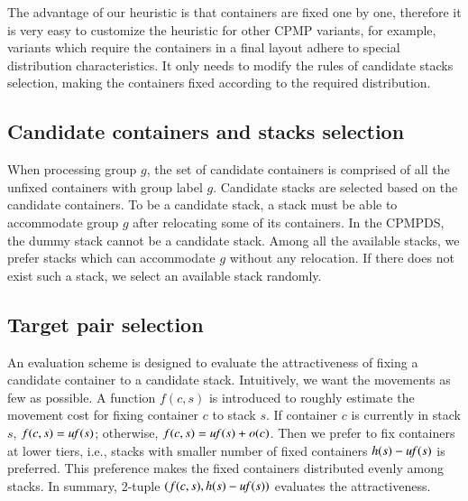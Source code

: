 \documentclass[review,3p,times,authoryear,12pt]{elsarticle}
\begin{document}
The advantage of our heuristic is that containers are fixed one by one, therefore it is very easy to customize the heuristic for other CPMP variants, for example, variants which require the containers in a final layout adhere to special distribution characteristics. It only needs to modify the rules of candidate stacks selection, making the containers fixed according to the required distribution.



\subsection{Candidate containers and stacks selection}
\label{sec:can}
When processing group $g$, the set of candidate containers is comprised of all the unfixed containers with group label $g$. Candidate stacks are selected based on the candidate containers.
To be a candidate stack, a stack must be able to accommodate group $g$ after relocating some of its containers.
In the CPMPDS, the dummy stack cannot be a candidate stack. Among all the available stacks, we prefer stacks which can accommodate $g$ without any relocation. If there does not exist such a stack, we select an available stack randomly.

\subsection{Target pair selection}
\label{sec:tar}
An evaluation scheme is designed to evaluate the attractiveness of fixing a candidate container to a candidate stack.
Intuitively, we want the movements as few as possible. A function $f(c,s)$ is introduced to roughly estimate the movement cost for fixing container $c$ to stack $s$. If container $c$ is currently in stack $s$, $f(c,s)=\id{uf}(s)$; otherwise, $f(c,s)=\id{uf}(s)+o(c)$. Then we prefer to fix containers at lower tiers, i.e., stacks with smaller number of fixed containers $h(s)-\id{uf}(s)$ is preferred. This preference makes the fixed containers distributed evenly among stacks. In summary, 2-tuple $(f(c,s), h(s)-\id{uf}(s))$ evaluates the attractiveness.
\end{document}
